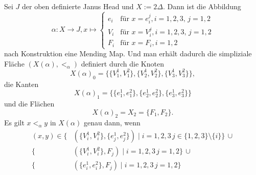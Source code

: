 \documentclass[12pt,titlepage]{article}
\begin{document}
  \begin{bsp}
  Sei $J$ der oben definierte Janus Head und $X:= 2\Delta$. Dann ist die Abbildung 
  \[
  \alpha: X \to J, x \mapsto 
  \begin{cases}
e_i & \text{für } x =e_i^j ,i=1,2,3,\,j=1,2\\
V_i &\text{für } x =V_i^j,i=1,2,3,\,j=1,2\\
F_i &\text{für } x=F_i , i=1,2 
\end{cases}
  \]
  nach Konstruktion eine Mending Map. Und man erhält dadurch die simpliziale Fläche $(X(\alpha),<_\alpha)$ definiert durch die Knoten
  \[
  X(\alpha)_0=\{\{V_1^1,V_1^2\},\{V_2^1,V_2^2\},\{V_3^1,V_3^2\}\},
  \]
  die Kanten
  \[
  X(\alpha)_1=\{\{e_1^1,e_1^2\},\{e_2^1,e_2^2\},\{e_3^1,e_3^2\}\}
  \]
  und die Flächen 
  \[
X(\alpha)_2=X_2=\{F_1,F_2\} .
  \]
  Es gilt $x<_{\alpha}y$ in $X(\alpha)$ genau dann, wenn
  \begin{align*}
 (x,y) \in \{&(\{V_i^1,V_i^2\}, \{e_j^1,e_j^2\})\mid i=1,2,3 \, j\in\{1,2,3\} \setminus \{i\}\}\, \cup\\
  \{&(\{V_i^1,V_i^2\}, F_j)\mid i=1,2,3 \, j=1,2 \} \,\cup\\
  \{&(\{e_i^1,e_i^2\}, F_j)\mid i=1,2,3 \, j=1,2 \} 
\end{align*}
 \end{bsp}
\end{document}
